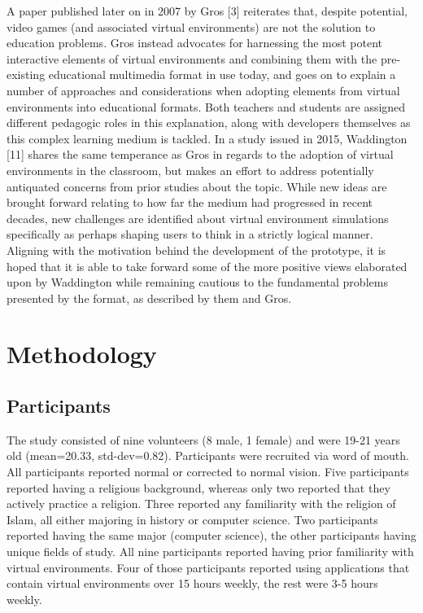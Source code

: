 \documentclass{vgtc}                          %
\begin{document}
A paper published later on in 2007 by Gros [3] reiterates that, despite potential, video games (and associated virtual environments) are not the solution to education problems. Gros instead advocates for harnessing the most potent interactive elements of virtual environments and combining them with the pre-existing educational multimedia format in use today, and goes on to explain a number of approaches and considerations when adopting elements from virtual environments into educational formats. Both teachers and students are assigned different pedagogic roles in this explanation, along with developers themselves as this complex learning medium is tackled. In a study issued in 2015, Waddington [11] shares the same temperance as Gros in regards to the adoption of virtual environments in the classroom, but makes an effort to address potentially antiquated concerns from prior studies about the topic. While new ideas are brought forward relating to how far the medium had progressed in recent decades, new challenges are identified about virtual environment simulations specifically as perhaps shaping users to think in a strictly logical manner. Aligning with the motivation behind the development of the prototype, it is hoped that it is able to take forward some of the more positive views elaborated upon by Waddington while remaining cautious to the fundamental problems presented by the format, as described by them and Gros.

\section{Methodology}

\subsection{Participants}

The study consisted of nine volunteers (8 male, 1 female) and were 19-21 years old (mean=20.33, std-dev=0.82). Participants were recruited via word of mouth. All participants reported normal or corrected to normal vision. Five participants reported having a religious background, whereas only two reported that they actively practice a religion. Three reported any familiarity with the religion of Islam, all either majoring in history or computer science. Two participants reported having the same major (computer science), the other participants having unique fields of study. All nine participants reported having prior familiarity with virtual environments. Four of those participants reported using applications that contain virtual environments over 15 hours weekly, the rest were 3-5 hours weekly.
\end{document}
